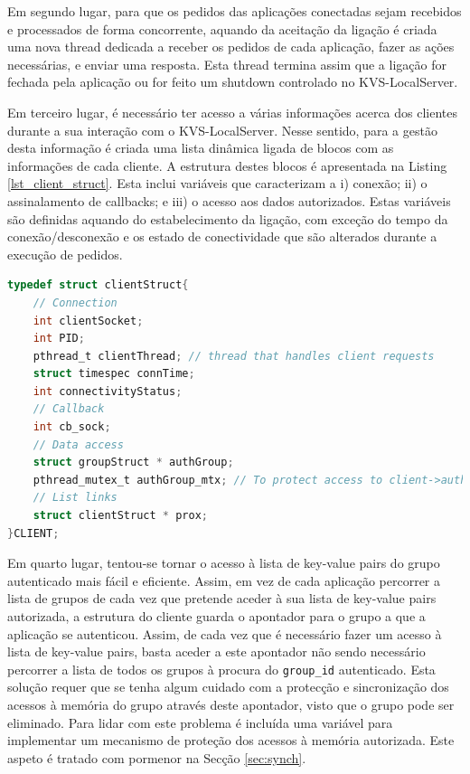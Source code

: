 Em segundo lugar, para que os pedidos das aplicações conectadas sejam recebidos e processados de forma concorrente, aquando da aceitação da ligação é criada uma nova thread dedicada a receber os pedidos de cada aplicação, fazer as ações necessárias, e enviar uma resposta. Esta thread termina assim que a ligação for fechada pela aplicação ou for feito um shutdown controlado no KVS-LocalServer.

Em terceiro lugar, é necessário ter acesso a várias informações acerca dos clientes durante a sua interação com o KVS-LocalServer. Nesse sentido, para a gestão desta informação é criada uma lista dinâmica ligada de blocos com as informações de cada cliente. A estrutura destes blocos é apresentada na Listing \ref{lst_client_struct}. Esta inclui variáveis que caracterizam a i) conexão; ii) o assinalamento de callbacks; e iii) o acesso aos dados autorizados. Estas variáveis são definidas aquando do estabelecimento da ligação, com exceção do tempo da conexão/desconexão e os estado de conectividade que são alterados durante a execução de pedidos.

\begin{lstlisting}[language=C,label={lst_client_struct},caption=Estrutura \texttt{CLIENT} para a gestão de clientes no KVS-LocalServer.]
typedef struct clientStruct{
    // Connection
    int clientSocket;
    int PID;
    pthread_t clientThread; // thread that handles client requests
    struct timespec connTime;
    int connectivityStatus;
    // Callback
    int cb_sock;
    // Data access
    struct groupStruct * authGroup;
    pthread_mutex_t authGroup_mtx; // To protect access to client->authGroup
    // List links
    struct clientStruct * prox;
}CLIENT;
\end{lstlisting}

Em quarto lugar, tentou-se tornar o acesso à lista de key-value pairs do grupo autenticado mais fácil e eficiente. Assim, em vez de cada aplicação percorrer a lista de grupos de cada vez que pretende aceder à sua lista de key-value pairs autorizada, a estrutura do cliente guarda o apontador para o grupo a que a aplicação se autenticou. Assim, de cada vez que é necessário fazer um acesso à lista de key-value pairs, basta aceder a este apontador não sendo necessário percorrer a lista de todos os grupos à procura do \texttt{group\_id} autenticado. Esta solução requer que se tenha algum cuidado com a protecção e sincronização dos acessos à memória do grupo através deste apontador, visto que o grupo pode ser eliminado. Para lidar com este problema é incluída uma variável para implementar um mecanismo de proteção dos acessos à memória autorizada. Este aspeto é tratado com pormenor na Secção \ref{sec:synch}.

